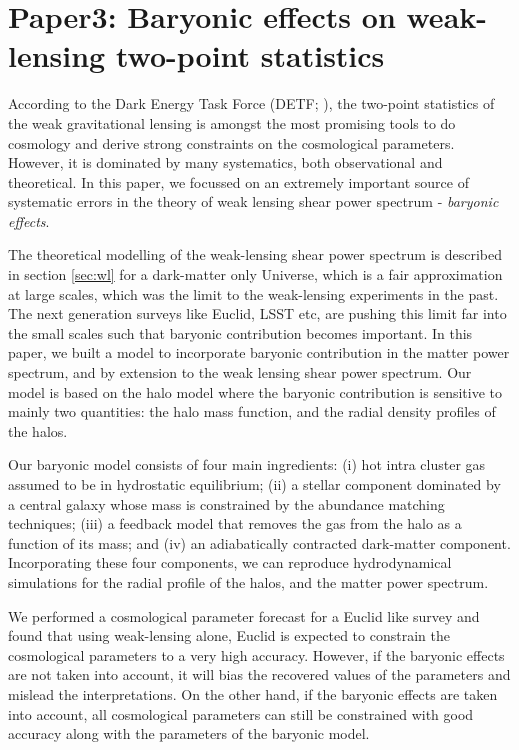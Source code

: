 \chapter{Paper3: Baryonic effects on weak-lensing two-point statistics}\label{paper:baryoniceffects}

According to the Dark Energy Task Force (DETF; \cite{2006astro.ph..9591A}), 
the two-point statistics of the weak gravitational lensing is amongst the most promising
tools to do cosmology and derive strong constraints on the cosmological parameters. 
However, it is dominated by many systematics, both observational and theoretical.
In this paper, we focussed on an extremely important source of systematic errors in the 
theory of weak lensing shear power spectrum - {\it baryonic effects}. 

The theoretical modelling of the weak-lensing shear power spectrum
is described in section \ref{sec:wl} for a dark-matter only Universe, 
which is a fair approximation
at large scales, which was the limit to the weak-lensing experiments in the past. 
The next generation surveys like Euclid, LSST etc, 
are pushing this limit far into the small scales such
that baryonic contribution becomes important. In this paper, we built a model
to incorporate baryonic contribution in the matter power spectrum,
and by extension to the weak lensing shear power spectrum. Our model is based on 
the halo model where the baryonic contribution is sensitive to mainly two quantities: 
the halo mass function, and the radial density profiles of the halos.

Our baryonic model consists of four main ingredients: 
(i) hot intra cluster gas assumed to be in hydrostatic equilibrium;
(ii) a stellar component dominated by a central galaxy 
whose mass is constrained by the abundance matching techniques;
(iii) a feedback model that removes the gas from the halo as a function
of its mass; and 
(iv) an adiabatically contracted dark-matter component. 
Incorporating these four components, 
we can reproduce hydrodynamical simulations 
for the radial profile of the halos, and the matter power spectrum. 

We performed a cosmological parameter forecast for a Euclid like survey and found that using
weak-lensing alone, Euclid is expected to constrain the cosmological parameters to a very
high accuracy. However, if the baryonic effects are not taken into account, it will bias
the recovered values of the parameters and mislead the interpretations. On the other hand,
if the baryonic effects are taken into account, all cosmological
parameters can still be constrained with good accuracy along with the parameters
of the baryonic model.

